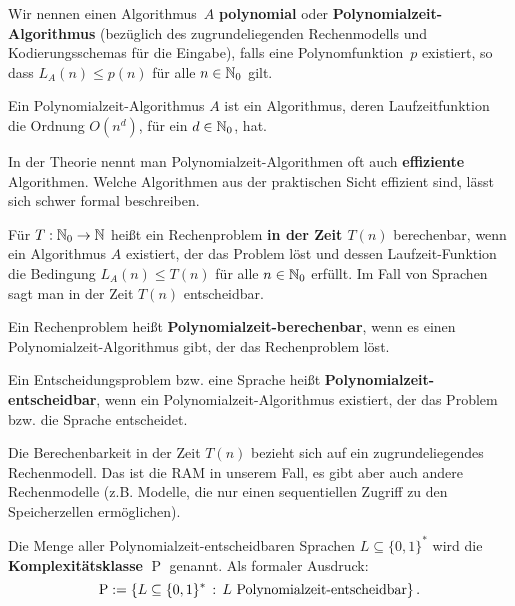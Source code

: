\begin{defn} 
Wir nennen einen Algorithmus~$A$ \textbf{polynomial} oder \textbf{Polynomialzeit-Algorithmus} (bezüglich des zugrundeliegenden Rechenmodells und Kodierungsschemas für die Eingabe), falls eine Polynomfunktion~$p$ existiert, so dass $L_A(n) \leq p(n)$ für alle $n \in \mathbb{N}_0$ gilt.
\end{defn} 

\begin{bem}
	Ein Polynomialzeit-Algorithmus $A$ ist ein Algorithmus, deren Laufzeitfunktion die Ordnung $O(n^d)$, für ein $d \in \mathbb{N}_0$, hat. 
\end{bem} 

\begin{bem}
	In der Theorie nennt man Polynomialzeit-Algorithmen oft auch \textbf{effiziente} Algorithmen. Welche Algorithmen aus der praktischen Sicht effizient sind, lässt sich schwer formal beschreiben.
\end{bem} 

\begin{defn}
	Für $T: \mathbb{N}_0 \to \mathbb{N}$ heißt ein Rechenproblem \textbf{in der Zeit $T(n)$} berechenbar, wenn ein Algorithmus $A$ existiert, der das Problem löst und dessen Laufzeit-Funktion die Bedingung $L_A(n) \le T(n)$ für alle $n \in \mathbb{N}_0$ erfüllt. Im Fall von Sprachen sagt man \glqq in der Zeit $T(n)$ entscheidbar\grqq. 
	
	Ein Rechenproblem heißt \textbf{Polynomialzeit-berechenbar}, wenn es einen Po\-ly\-no\-mi\-al\-zeit-Algorithmus gibt, der das Rechenproblem löst. 
	
	Ein Entscheidungsproblem bzw. eine Sprache heißt \textbf{Polynomialzeit-\-ent\-scheid\-bar}, wenn ein Polynomialzeit-Algorithmus existiert, der das Problem bzw. die Sprache entscheidet. 
\end{defn} 

\begin{bem}
	Die Berechenbarkeit in der Zeit $T(n)$ bezieht sich auf ein zugrundeliegendes Rechenmodell. Das ist die RAM in unserem Fall, es gibt aber auch andere Rechenmodelle (z.B. Modelle, die nur einen sequentiellen Zugriff zu den Speicherzellen ermöglichen). 
\end{bem} 

\begin{defn}
	Die Menge aller Polynomialzeit-entscheidbaren Sprachen $L \subseteq \{0,1\}^\ast$ wird die \textbf{Komplexitätsklasse} $\operatorname{P}$ genannt. Als formaler Ausdruck: 
	\[
			\DP := \setcond{L \subseteq \{0,1\}^\ast }{L \ \text{Polynomialzeit-entscheidbar} } .
	\]
\end{defn} 

